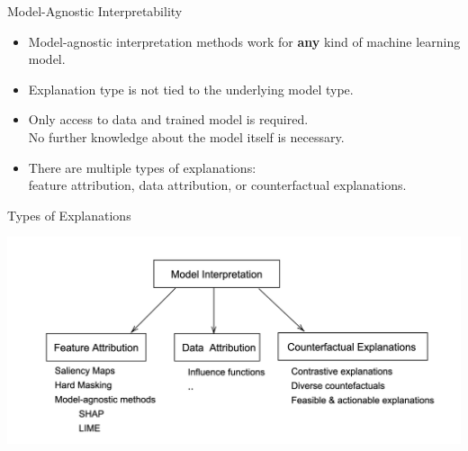 \documentclass[11pt,compress,t,notes=noshow, aspectratio=169, xcolor=table]{beamer}
\begin{document}
\begin{frame}{Model-Agnostic Interpretability}
	\begin{itemize}
		\itemsep1em
		\item Model-agnostic interpretation methods work for \textbf{any} kind of machine learning model.
		\item Explanation type is not tied to the underlying model type.
		\item Only access to data and trained model is required.\\
		 No further knowledge about the model itself is necessary.
		\item There are multiple types of explanations:\\
		feature attribution, data attribution, or counterfactual explanations.
	\end{itemize}
\end{frame}


\begin{frame}{Types of Explanations}
	\begin{center}
		\includegraphics[width=\textwidth]{figure/1-attributions.png}
    \end{center}
\end{frame}
\end{document}
